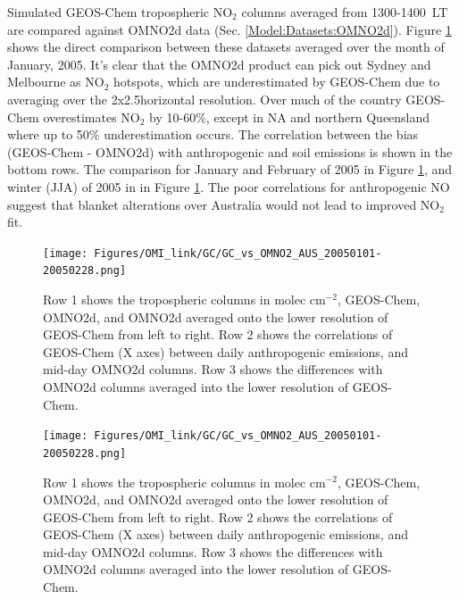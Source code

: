     Simulated GEOS-Chem tropospheric NO$_2$ columns averaged from 1300-1400~LT are compared against OMNO2d data (Sec. \ref{Model:Datasets:OMNO2d}). 
    Figure \ref{Model:Analysis:NOx:fig_GC_vs_OMNO2d_summer_2005} shows the direct comparison between these datasets averaged over the month of January, 2005.
    It's clear that the OMNO2d product can pick out Sydney and Melbourne as NO$_2$ hotspots, which are underestimated by GEOS-Chem due to averaging over the 2x2.5\degr horizontal resolution.
    Over much of the country GEOS-Chem overestimates NO$_2$ by 10-60\%, except in NA and northern Queensland where up to 50\% underestimation occurs.
    The correlation between the bias (GEOS-Chem - OMNO2d) with anthropogenic and soil emissions is shown in the bottom rows.
    The comparison for January and February of 2005 in Figure \ref{Model:Analysis:NOx:fig_GC_vs_OMNO2d_summer_2005}, and winter (JJA) of 2005 in in Figure \ref{Model:Analysis:NOx:fig_GC_vs_OMNO2d_summer_2005}.
    The poor correlations for anthropogenic NO suggest that blanket alterations over Australia would not lead to improved NO$_2$ fit. 
    
    \begin{figure}
      \texttt{[image: Figures/OMI\_link/GC/GC\_vs\_OMNO2\_AUS\_20050101-20050228.png]}
      \caption{%
        Row 1 shows the tropospheric columns in molec cm$^{-2}$, GEOS-Chem, OMNO2d, and OMNO2d averaged onto the lower resolution of GEOS-Chem from left to right.
        Row 2 shows the correlations of GEOS-Chem (X axes) between daily anthropogenic emissions, and mid-day OMNO2d columns.
        Row 3 shows the differences with OMNO2d columns averaged into the lower resolution of GEOS-Chem.
      }
      \label{Model:Analysis:NOx:fig_GC_vs_OMNO2d_summer_2005}
    \end{figure}
    
    \begin{figure}
      \texttt{[image: Figures/OMI\_link/GC/GC\_vs\_OMNO2\_AUS\_20050101-20050228.png]}
      \caption{%
        Row 1 shows the tropospheric columns in molec cm$^{-2}$, GEOS-Chem, OMNO2d, and OMNO2d averaged onto the lower resolution of GEOS-Chem from left to right.
        Row 2 shows the correlations of GEOS-Chem (X axes) between daily anthropogenic emissions, and mid-day OMNO2d columns.
        Row 3 shows the differences with OMNO2d columns averaged into the lower resolution of GEOS-Chem.
      }
      \label{Model:Analysis:NOx:fig_GC_vs_OMNO2d_winter_2005}
    \end{figure}
    
